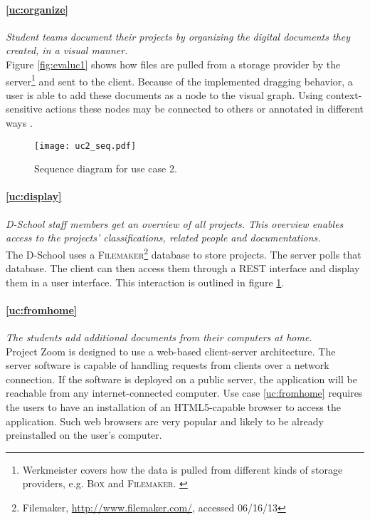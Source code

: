 \paragraph{\ref{uc:organize}} \textit{Student teams document their projects by organizing the digital documents they created, in a visual manner.}\\
Figure \ref{fig:evaluc1} shows how files are pulled from a storage provider by the server\footnote{Werkmeister covers how the data is pulled from different kinds of storage providers, e.g. \textsc{Box} and \textsc{Filemaker}. \cite{Werkmeister_2013}} and sent to the client. Because of the implemented dragging behavior, a user is able to add these documents as a node to the visual graph. Using context-sensitive actions these nodes may be connected to others or annotated in different ways \cite{Herold_2013}. 

\begin{figure}
\begin{center}
\texttt{[image: uc2\_seq.pdf]}
\caption{Sequence diagram for use case 2.}
\label{fig:evaluc2}
\end{center}
\end{figure}

\paragraph{\ref{uc:display}} \textit{D-School staff members get an overview of all projects. This overview enables access to the pro\-jects' classifications, related people and documentations.}\\
The D-School uses a \textsc{Filemaker}\footnote{Filemaker, \url{http://www.filemaker.com/}, accessed 06/16/13} database to store projects. The server polls that database. The client can then access them through a REST interface and display them in a user interface. This interaction is outlined in figure \ref{fig:evaluc2}.

\paragraph{\ref{uc:fromhome}} \textit{The students add additional documents from their computers at home.}\\
Project Zoom is designed to use a web-based client-server architecture. The server software is capable of handling requests from clients over a network connection. If the software is deployed on a public server, the application will be reachable from any internet-connected computer. Use case \ref{uc:fromhome} requires the users to have an installation of an HTML5-capable browser to access the application. Such web browsers are very popular and likely to be already preinstalled on the user's computer.

